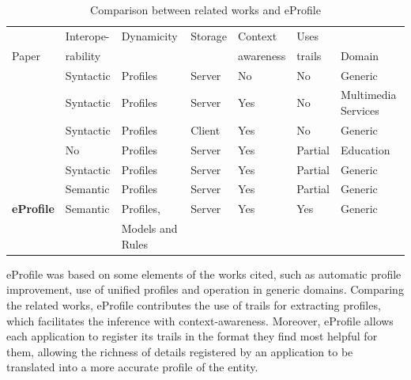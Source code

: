 \documentclass{svjour3}                     %
\begin{document}
\begin{table}\centering\footnotesize
  \begin{tabular*}{1.16\textwidth}{@{}lllllll@{}}
    \toprule
                                         & Interope-  & Dynamicity   & Storage  & Context       & Uses    &                     \\
    Paper                                & rability   &             &          & awareness     & trails  & Domain              \\
    \midrule
    \citet{kim08}                    & Syntactic   & Profiles       & Server   & No            & No      & Generic             \\
    \citet{chellouche10}             & Syntactic   & Profiles       & Server   & Yes           & No      & Multimedia Services \\
    \citet{niederee04}               & Syntactic   & Profiles       & Client   & Yes           & No      & Generic             \\
    \citet{pelep}                    & No         & Profiles       & Server   & Yes           & Partial & Education           \\
    \citet{razmerita11}              & Syntactic   & Profiles       & Server   & Yes           & Partial & Generic             \\
    \citet{tao11}                    & Semantic   & Profiles       & Server   & Yes           & Partial & Generic             \\
    \textbf{eProfile}                & Semantic   & Profiles,      & Server   & Yes           & Yes     & Generic             \\
                            &            & Models and Rules & & & & \\
    \bottomrule
  \end{tabular*}
  \caption{Comparison between related works and eProfile}
  \label{tab:comparacao2}
\end{table}

eProfile was based on some elements of the works cited, such as automatic profile improvement, use of unified profiles and operation in generic domains. Comparing the related works, eProfile contributes the use of trails for extracting profiles, which facilitates the inference with context-awareness. Moreover, eProfile allows each application to register its trails in the format they find most helpful for them, allowing the richness of details registered by an application to be translated into a more accurate profile of the entity.
\end{document}
